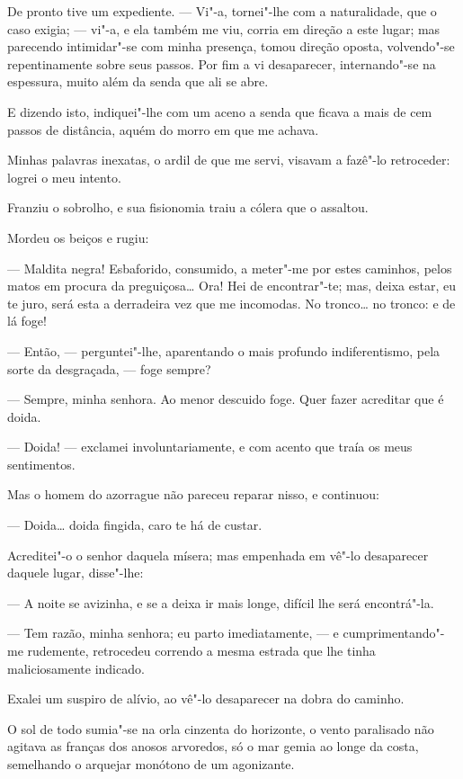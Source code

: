 De pronto tive um expediente. --- Vi"-a, tornei"-lhe com a naturalidade,
que o caso exigia; --- vi"-a, e ela também me viu, corria em direção a
este lugar; mas parecendo intimidar"-se com minha presença, tomou direção
oposta, volvendo"-se repentinamente sobre seus passos. Por fim a vi
desaparecer, internando"-se na espessura, muito além da senda que ali se
abre.

E dizendo isto, indiquei"-lhe com um aceno a senda que ficava a mais de
cem passos de distância, aquém do morro em que me achava.

Minhas palavras inexatas, o ardil de que me servi, visavam a fazê"-lo
retroceder: logrei o meu intento.

Franziu o sobrolho, e sua fisionomia traiu a cólera que o assaltou.

Mordeu os beiços e rugiu:

--- Maldita negra! Esbaforido, consumido, a meter"-me por estes caminhos,
pelos matos em procura da preguiçosa\ldots{} Ora! Hei de encontrar"-te; mas,
deixa estar, eu te juro, será esta a derradeira vez que me incomodas. No
tronco\ldots{} no tronco: e de lá foge!

--- Então, --- perguntei"-lhe, aparentando o mais profundo indiferentismo,
pela sorte da desgraçada, --- foge sempre?

--- Sempre, minha senhora. Ao menor descuido foge. Quer fazer acreditar
que é doida.

--- Doida! --- exclamei involuntariamente, e com acento que traía os meus
sentimentos.

Mas o homem do azorrague não pareceu reparar nisso, e continuou:

--- Doida\ldots{} doida fingida, caro te há de custar.

Acreditei"-o o senhor daquela mísera; mas empenhada em vê"-lo desaparecer
daquele lugar, disse"-lhe:

--- A noite se avizinha, e se a deixa ir mais longe, difícil lhe será
encontrá"-la.

--- Tem razão, minha senhora; eu parto imediatamente, --- e
cumprimentando"-me rudemente, retrocedeu correndo a mesma estrada que lhe
tinha maliciosamente indicado.

Exalei um suspiro de alívio, ao vê"-lo desaparecer na dobra do caminho.

O sol de todo sumia"-se na orla cinzenta do horizonte, o vento paralisado
não agitava as franças dos anosos arvoredos, só o mar gemia ao longe da
costa, semelhando o arquejar monótono de um agonizante.

